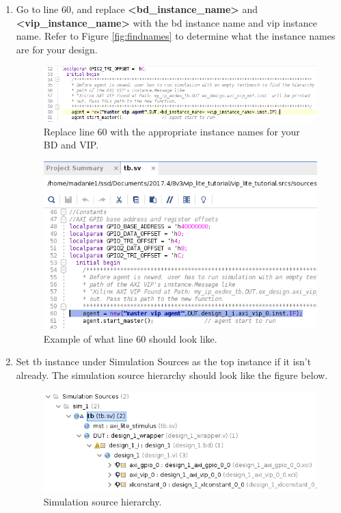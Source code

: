 \documentclass[11pt]{article}
\begin{document}
\begin{enumerate}
	\item Go to line 60, and replace \textbf{\textless bd\_instance\_name\textgreater} and \textbf{\textless vip\_instance\_name\textgreater} with the bd instance name and vip instance name. Refer to Figure \ref{fig:findnames} to determine what the instance names are for your design.
		\begin{figure}[H]
		  \centering
		  \includegraphics[scale=0.5]{instancename1.png}
		  \caption{Replace line 60 with the appropriate instance names for your BD and VIP.}
		  \label{fig:instancename1}
		\end{figure}
				\begin{figure}[H]
		  \centering
		  \includegraphics[scale=0.5]{instancename2.png}
		  \caption{Example of what line 60 should look like.}
		  \label{fig:instancename2}
		\end{figure}
	\item Set tb instance under Simulation Sources as the top instance if it isn't already. The simulation source hierarchy should look like the figure below. 
		\begin{figure}[H]
		  \centering
		  \includegraphics[scale=0.5]{filehierarchy.png}
		  \caption{Simulation source hierarchy.}
		  \label{fig:filehierarchy}
		\end{figure} 
\end{enumerate}
\end{document}
